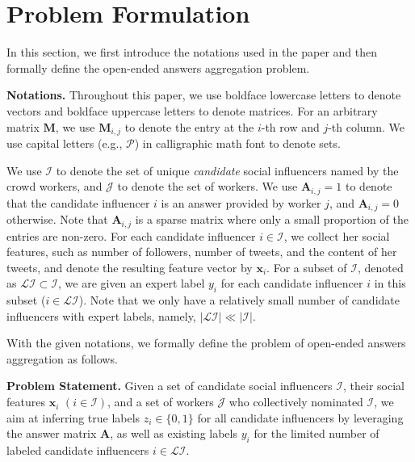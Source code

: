 \section{Problem Formulation}

In this section, we first introduce the notations used in the paper and then formally define the open-ended answers aggregation problem.

\smallskip
\noindent\textbf{Notations.} Throughout this paper, we use boldface lowercase letters to denote vectors and boldface uppercase letters to denote matrices. For an arbitrary matrix $\mathbf{M}$, we use $\mathbf{M}_{i,j}$ to denote the entry at the $i$-th row and $j$-th column. We use capital letters (e.g., $\mathcal{P}$) in calligraphic math font to denote sets.

We use $\mathcal{I}$ to denote the set of unique \emph{candidate} social influencers named by the crowd workers, and $\mathcal{J}$ to denote the set of workers. We use $\mathbf{A}_{i,j}=1$ to denote that the candidate influencer $i$ is an answer provided by worker $j$, and $\mathbf{A}_{i,j}=0$ otherwise. Note that $\mathbf{A}_{i,j}$ is a sparse matrix where only a small proportion of the entries are non-zero. 
For each candidate influencer $i \in \mathcal{I}$, we collect her social features, such as number of followers, number of tweets, and the content of her tweets, and denote the resulting feature vector by $\mathbf{x}_i$. For a subset of $\mathcal{I}$, denoted as $\mathcal{LI}\subset \mathcal{I}$, we are given an expert label $y_i$ for each candidate influencer $i$ in this subset ($i\in \mathcal{LI}$). Note that we only have a relatively small number of candidate influencers with expert labels, namely, $|\mathcal{LI}| \ll |\mathcal{I}|$. %



With the given notations, we formally define the problem of open-ended answers aggregation as follows.

\smallskip
\noindent\textbf{Problem Statement.} Given a set of candidate social influencers $\mathcal{I}$, their social features $\mathbf{x}_i$ $(i \in \mathcal{I})$, and a set of workers $\mathcal{J}$ who collectively nominated $\mathcal{I}$, we aim at inferring true labels $z_i \in \{0,1\}$ for all candidate influencers by leveraging the answer matrix $\mathbf{A}$, as well as existing labels $y_i$ for the limited number of labeled candidate influencers $i\in \mathcal{LI}$. 